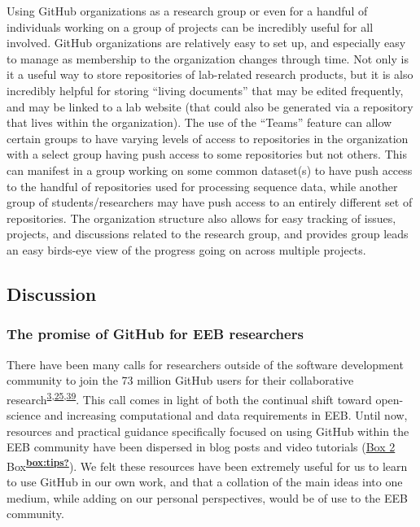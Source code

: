 Using GitHub organizations as a research group or even for a handful of individuals working on a group of projects can be incredibly useful for all involved.
GitHub organizations are relatively easy to set up, and especially easy to manage as membership to the organization changes through time.
Not only is it a useful way to store repositories of lab-related research products, but it is also incredibly helpful for storing ``living documents'' that may be edited frequently, and may be linked to a lab website (that could also be generated via a repository that lives within the organization).
The use of the ``Teams'' feature can allow certain groups to have varying levels of access to repositories in the organization with a select group having push access to some repositories but not others.
This can manifest in a group working on some common dataset(s) to have push access to the handful of repositories used for processing sequence data, while another group of students/researchers may have push access to an entirely different set of repositories.
The organization structure also allows for easy tracking of issues, projects, and discussions related to the research group, and provides group leads an easy birds-eye view of the progress going on across multiple projects.

\hypertarget{discussion}{%
\subsection{Discussion}\label{discussion}}

\hypertarget{the-promise-of-github-for-eeb-researchers}{%
\subsubsection{The promise of GitHub for EEB researchers}\label{the-promise-of-github-for-eeb-researchers}}

There have been many calls for researchers outside of the software development community to join the 73 million GitHub users for their collaborative research\textsuperscript{\protect\hyperlink{ref-10ghgV3S8}{3},\protect\hyperlink{ref-1Du6fzB8g}{25},\protect\hyperlink{ref-UsTxAq4f}{39}}.
This call comes in light of both the continual shift toward open-science and increasing computational and data requirements in EEB.
Until now, resources and practical guidance specifically focused on using GitHub within the EEB community have been dispersed in blog posts and video tutorials (\protect\hyperlink{tips}{Box 2} Box\textsuperscript{\protect\hyperlink{ref-box:tips}{\textbf{box:tips?}}}).
We felt these resources have been extremely useful for us to learn to use GitHub in our own work, and that a collation of the main ideas into one medium, while adding on our personal perspectives, would be of use to the EEB community.


